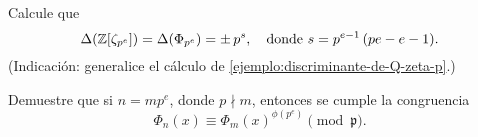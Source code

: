 \begin{ejercicio}
  Calcule que
  \[ \Delta (\mathbb{Z} [\zeta_{p^e}]) = \Delta (\Phi_{p^e}) = \pm\,p^s,
     \quad \text{donde } s = p^{e-1}\,(pe - e - 1). \]
  (Indicación: generalice el cálculo de
  \ref{ejemplo:discriminante-de-Q-zeta-p}.)
\end{ejercicio}

\begin{ejercicio}
  Demuestre que si $n = m p^e$, donde $p \nmid m$, entonces se cumple
  la congruencia
  $$\Phi_n (x) \equiv \Phi_m (x)^{\phi (p^e)} \pmod{\mathfrak{p}}.$$
\end{ejercicio}
